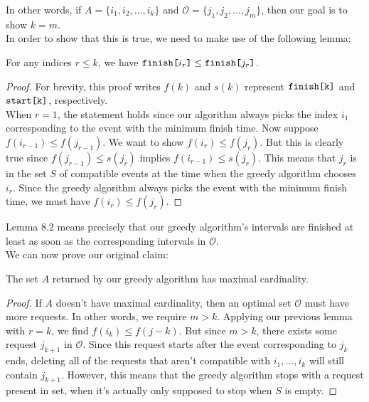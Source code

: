 In other words, if $A = \{i_1, i_2, \ldots, i_k\}$ and $\mathcal{O} = \{j_1, j_2, \ldots, j_m\}$, then our goal is to show $k = m$. \\

In order to show that this is true, we need to make use of the following lemma:\\

\begin{lemma}
For any indices $r \leq k$, we have $\verb!finish[!i_{r}\verb!]! \leq \verb!finish[!j_r\verb!]!$. 
\end{lemma}
\begin{proof}
For brevity, this proof writes $f(k)$ and $s(k)$ represent $\verb!finish[k]!$ and $\verb!start[k]!$, respectively. \\

When $r = 1$, the statement holds since our algorithm always picks the index $i_1$ corresponding to the event with the minimum finish time. Now suppose $f(i_{r-1}) \leq f(j_{r-1})$. We want to show $f(i_{r}) \leq f(j_{r})$. But this is clearly true since $f(j_{r - 1}) \leq s(j_{r})$ implies $f(i_{r - 1}) \leq s(j_r)$. This means that $j_r$ is in the set $S$ of compatible events at the time when the greedy algorithm chooses $i_r$. Since the greedy algorithm always picks the event with the minimum finish time, we must have $f(i_r) \leq f(j_r)$.
\end{proof}

Lemma $8.2$ means precisely that our greedy algorithm's intervals are finished at least as soon as the corresponding intervals in $\mathcal{O}$. \\

We can now prove our original claim:


\begin{proposition}
The set $A$ returned by our greedy algorithm has maximal cardinality.
\end{proposition}
\begin{proof}
If $A$ doesn't have maximal cardinality, then an optimal set $\mathcal{O}$ must have more requests. In other words, we require $m > k$. Applying our previous lemma with $r = k$, we find $f(i_k) \leq f(j-k)$. But since $m > k$, there exists some request $j_{k+1}$ in $\mathcal{O}$. Since this request starts after the event corresponding to $j_k$ ends, deleting all of the requests that aren't compatible with $i_1, \ldots, i_k$ will still contain $j_{k+1}$. However, this means that the greedy algorithm stops with a request present in set, when it's actually only supposed to stop when $S$ is empty.
\end{proof}


